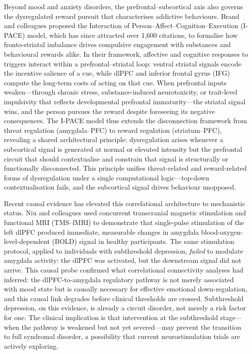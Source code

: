 Beyond mood and anxiety disorders, the prefrontal--subcortical axis also
governs the dysregulated reward pursuit that characterises addictive
behaviours.  Brand and colleagues proposed the Interaction of
Person--Affect--Cognition--Execution (I-PACE) model, which has since
attracted over 1,600 citations, to formalise how fronto-striatal imbalance
drives compulsive engagement with substances and behavioural rewards
alike.\cite{brand2019}  In their framework, affective and cognitive responses to
triggers interact within a prefrontal--striatal loop: ventral striatal
signals encode the incentive salience of a cue, while dlPFC and inferior
frontal gyrus (IFG) compute the long-term costs of acting on that cue.
When prefrontal inputs weaken---through chronic stress, substance-induced
neurotoxicity, or trait-level impulsivity that reflects developmental
prefrontal immaturity---the striatal signal wins, and the person pursues
the reward despite foreseeing its negative consequences.  The I-PACE model
thus extends the disconnection framework from threat regulation
(amygdala--PFC) to reward regulation (striatum--PFC), revealing a shared
architectural principle: dysregulation arises whenever a subcortical signal
is generated at normal or elevated intensity but the prefrontal circuit
that should contextualise and constrain that signal is structurally or
functionally disconnected.  This principle unifies threat-related and
reward-related forms of dysregulation under a single computational
logic---top-down contextualisation fails, and the subcortical signal drives
behaviour unopposed.

Recent causal evidence has elevated this correlational architecture to
mechanistic status.  Niu and colleagues used concurrent transcranial
magnetic stimulation and functional MRI (TMS--fMRI) to demonstrate that
single-pulse stimulation of the left dlPFC produced immediate, measurable
changes in amygdala blood-oxygen-level-dependent (BOLD) signal in healthy
participants.\cite{niu2026}  The same stimulation protocol, applied to
individuals with subthreshold depression, \emph{failed} to modulate
amygdala activity: the dlPFC was activated, but the downstream signal did
not arrive.  This causal probe confirmed what correlational connectivity
analyses had inferred: the dlPFC-to-amygdala regulatory pathway is not
merely associated with mood state but is causally necessary for effective
emotional down-regulation, and this causal link degrades before clinical
thresholds are crossed.  Subthreshold depression, on this evidence, is
already a circuit disorder, not merely a risk factor for one.  The clinical
implication is that intervention at the subthreshold stage---when the
pathway is weakened but not yet severed---may prevent the transition to
full syndromal disorder, a possibility that current neurostimulation trials
are actively exploring.


